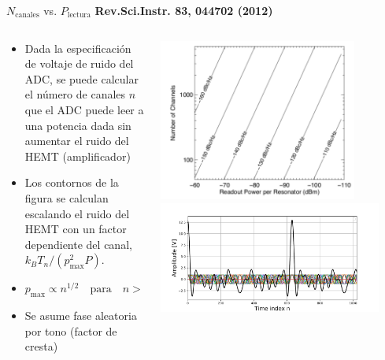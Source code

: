 \documentclass[ignorenonframetext,12pt]{beamer}
\begin{document}
\begin{frame}{$N_\text{canales}$ vs. $P_\text{lectura}$}
				\footnotesize{\textbf{Rev.Sci.Instr. 83, 044702 (2012)}}
				\begin{columns}
								\begin{column}{0.4\textwidth}
												\begin{itemize}
																\item \footnotesize{Dada la especificación de
																				voltaje de ruido del ADC, se puede
																				calcular el número de canales
																				{\color{red}$n$} que el ADC puede leer
																				a una potencia dada sin aumentar el
																				ruido del HEMT (amplificador)}
																\item Los contornos de la figura se calculan
																				escalando  el ruido del HEMT con un
																				factor dependiente del canal, $k_B
																				T_n /(p_\text{max}^2 P)$.
																\item $p_\text{max} \propto
																				n^{1/2}\quad\text{para}\quad n >> 1$
																\item {\color{blue}Se asume fase aleatoria por
																				tono (factor de cresta)}
												\end{itemize}
								\end{column}
								\begin{column}{0.6\textwidth}
												\centering
												\includegraphics[width=0.8\textwidth]{power_vs_Nchannels2}
												\includegraphics[width=0.9\textwidth]{in_spectrum_time}
								\end{column}
				\end{columns}
\end{frame}
\end{document}
